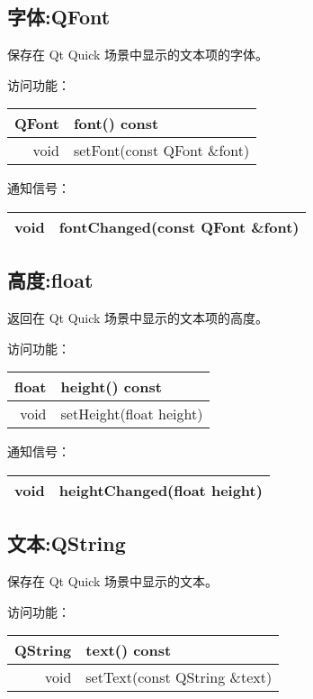 \subsection{字体:QFont}

保存在 Qt Quick 场景中显示的文本项的字体。

访问功能：

\begin{tabular}{|r|l|}
	\hline
	QFont	&font() const \\ 
	\hline
	void&	setFont(const QFont \&font) \\ 
	\hline
	\end{tabular}

通知信号：

\begin{tabular}{|r|l|}
	\hline
	void &	fontChanged(const QFont \&font) \\  
	\hline
	\end{tabular}

\subsection{高度:float}

返回在 Qt Quick 场景中显示的文本项的高度。

访问功能：

\begin{tabular}{|r|l|}
	\hline
	float &	height() const \\
	\hline
	void &	setHeight(float height) \\
	\hline
	\end{tabular}

通知信号：

\begin{tabular}{|r|l|}
	\hline
	void &	heightChanged(float height) \\ 
	\hline
	\end{tabular}

\subsection{文本:QString}

保存在 Qt Quick 场景中显示的文本。

访问功能：

\begin{tabular}{|r|l|}
	\hline
	QString	& text() const \\ 
	\hline
	void	&setText(const QString \&text) \\ 
	\hline
	\end{tabular}

